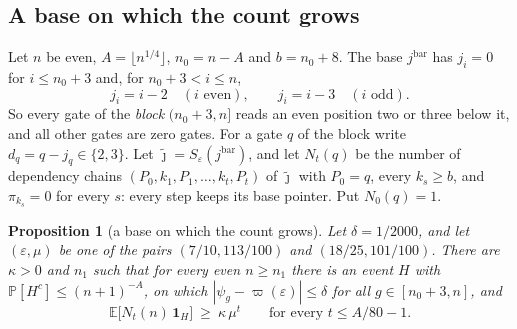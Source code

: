 \documentclass[11pt]{amsart}
\newtheorem{proposition}[theorem]{Proposition}
\theoremstyle{definition}
\theoremstyle{remark}
\newcommand{\eps}{\varepsilon}
\newcommand{\jt}{\tilde{\jmath}}
\newcommand{\PP}{\mathbb{P}}
\newcommand{\EE}{\mathbb{E}}
\begin{document}
\subsection{A base on which the count grows}

Let $n$ be even, $A=\lfloor n^{1/4}\rfloor$, $n_0=n-A$ and $b=n_0+8$. The base $j^{\mathrm{bar}}$ has
$j_i=0$ for $i\le n_0+3$ and, for $n_0+3<i\le n$,
\[
j_i=i-2\quad(i\text{ even}),\qquad j_i=i-3\quad(i\text{ odd}).
\]
So every gate of the \emph{block} $(n_0+3,n]$ reads an even position two or three below it, and
all other gates are zero gates. For a gate $q$ of the block write $d_q=q-j_q\in\{2,3\}$. Let
$\jt=S_\eps(j^{\mathrm{bar}})$, and let $N_t(q)$ be the number of dependency chains
$(P_0,k_1,P_1,\dots,k_t,P_t)$ of $\jt$ with $P_0=q$, every $k_s\ge b$, and $\pi_{k_s}=0$ for every
$s$: every step keeps its base pointer. Put $N_0(q)=1$.

\begin{proposition}[a base on which the count grows]\label{prop:barrier}
Let $\delta=1/2000$, and let $(\eps,\mu)$ be one of the pairs $(7/10,113/100)$ and
$(18/25,101/100)$. There are $\kappa>0$ and $n_1$ such that for every even $n\ge n_1$ there is an
event $H$ with
$\PP[H^c]\le(n+1)^{-A}$, on which $|\psi_g-\varpi(\eps)|\le\delta$ for all
$g\in[n_0+3,n]$, and
\[
\EE\bigl[N_t(n)\,\mathbf 1_H\bigr]\ \ge\ \kappa\,\mu^t\qquad\text{for every }t\le A/80-1 .
\]
\end{proposition}
\end{document}
